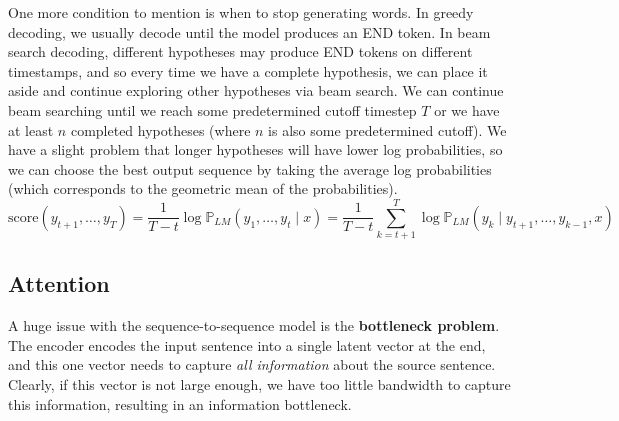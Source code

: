 \documentclass{article}
\begin{document}
    One more condition to mention is when to stop generating words. In greedy decoding, we usually decode until the model produces an END token. In beam search decoding, different hypotheses may produce END tokens on different timestamps, and so every time we have a complete hypothesis, we can place it aside and continue exploring other hypotheses via beam search. We can continue beam searching until we reach some predetermined cutoff timestep $T$ or we have at least $n$ completed hypotheses (where $n$ is also some predetermined cutoff). We have a slight problem that longer hypotheses will have lower log probabilities, so we can choose the best output sequence by taking the average log probabilities (which corresponds to the geometric mean of the probabilities). 
    \begin{equation}
      \mathrm{score}(y_{t+1}, \ldots, y_T) = \frac{1}{T-t} \log \mathbb{P}_{LM} (y_1, \ldots, y_t \mid x) = \frac{1}{T-t} \sum_{k=t+1}^T \log \mathbb{P}_{LM} ( y_k \mid y_{t+1}, \ldots, y_{k-1}, x)
    \end{equation}

  \subsection{Attention}

    A huge issue with the sequence-to-sequence model is the \textbf{bottleneck problem}. The encoder encodes the input sentence into a single latent vector at the end, and this one vector needs to capture \textit{all information} about the source sentence. Clearly, if this vector is not large enough, we have too little bandwidth to capture this information, resulting in an information bottleneck. 
\end{document}
